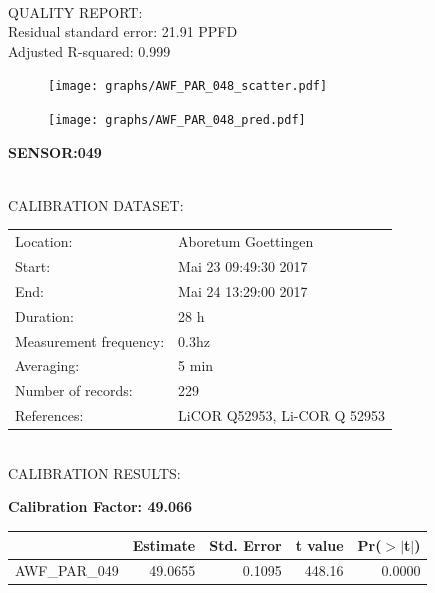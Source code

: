 \documentclass[oneside]{report}
\begin{document}
\hrulefill\\
QUALITY REPORT:\\
Residual standard error: 21.91 PPFD\\
Adjusted R-squared: 0.999



\begin{figure}[H]
  \centering
  \texttt{[image: graphs/AWF\_PAR\_048\_scatter.pdf]}
\end{figure}




\begin{figure}[H]
  \centering
  \texttt{[image: graphs/AWF\_PAR\_048\_pred.pdf]}
\end{figure}

\pagebreak


\begin{center}
\large{\textbf{SENSOR:049}}\\
\end{center}

\hrulefill\\
CALIBRATION DATASET:\\
\begin{table}[h!]
  \centering
  \label{tab:table1}
  \begin{tabular}{ll}
    Location: & Aboretum Goettingen\\ 
    
    
    Start:  & Mai 23 09:49:30 2017 \\
    End:   & Mai 24 13:29:00 2017\\ 
    Duration: & 28 h\\
    Measurement frequency: & 0.3hz\\
    Averaging:  &5 min\\
    Number of records: & 229 \\
    References: & LiCOR Q52953, Li-COR Q 52953 \\
  \end{tabular}
\end{table}

\hrulefill\\
CALIBRATION RESULTS:\\


\begin{center}
\textbf{\large{Calibration Factor: 49.066}}\\
\end{center}
\begin{table}[ht]
\centering
\begin{tabular}{rrrrr}
  \hline
 & Estimate & Std. Error & t value & Pr($>$$|$t$|$) \\ 
  \hline
AWF\_PAR\_049 & 49.0655 & 0.1095 & 448.16 & 0.0000 \\ 
   \hline
\end{tabular}
\end{table}
\end{document}
